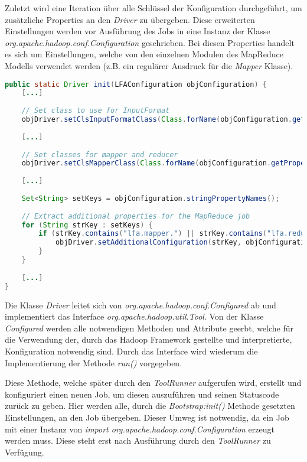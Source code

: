 Zuletzt wird eine Iteration über alle Schlüssel der Konfiguration durchgeführt, um zusätzliche Properties an den \textit{Driver} zu übergeben. Diese erweiterten Einstellungen werden vor Ausführung des Jobs in eine Instanz der Klasse \textit{org.apache.hadoop.conf.Configuration} geschrieben. Bei diesen Properties handelt es sich um Einstellungen, welche von den einzelnen Modulen des MapReduce Modells verwendet werden (z.B. ein regulärer Ausdruck für die \textit{Mapper} Klasse).\\

\begin{lstlisting}[language=Java,caption=Auszug der Methode \textit{Bootstrap:init()},label=lst:BootstrapInit]
public static Driver init(LFAConfiguration objConfiguration) {
	[...]
	
	// Set class to use for InputFormat
	objDriver.setClsInputFormatClass(Class.forName(objConfiguration.getProperty("lfa.driver.input.format")));
	
	[...]
	
	// Set classes for mapper and reducer
	objDriver.setClsMapperClass(Class.forName(objConfiguration.getProperty("lfa.driver.mapper")));
	
	[...]
	
	Set<String> setKeys = objConfiguration.stringPropertyNames();
	
	// Extract additional properties for the MapReduce job
	for (String strKey : setKeys) {
		if (strKey.contains("lfa.mapper.") || strKey.contains("lfa.reducer.") || strKey.contains("lfa.driver.add.")) {
			objDriver.setAdditionalConfiguration(strKey, objConfiguration.getProperty(strKey));
		}
	}
	
	[...]
}
\end{lstlisting}

Die Klasse \textit{Driver} leitet sich von \textit{org.apache.hadoop.conf.Configured} ab und implementiert das Interface \textit{org.apache.hadoop.util.Tool}. Von der Klasse \textit{Configured} werden alle notwendigen Methoden und Attribute geerbt, welche für die Verwendung der, durch das Hadoop Framework gestellte und interpretierte, Konfiguration notwendig sind. Durch das Interface wird wiederum die Implementierung der Methode \textit{run()} vorgegeben.

Diese Methode, welche später durch den \textit{ToolRunner} aufgerufen wird, erstellt und konfiguriert einen neuen Job, um diesen auszuführen und seinen Statuscode zurück zu geben. Hier werden alle, durch die \textit{Bootstrap:init()} Methode gesetzten Einstellungen, an den Job übergeben. Dieser Umweg ist notwendig, da ein Job mit einer Instanz von \textit{import org.apache.hadoop.conf.Configuration} erzeugt werden muss. Diese steht erst nach Ausführung durch den \textit{ToolRunner} zu Verfügung.

